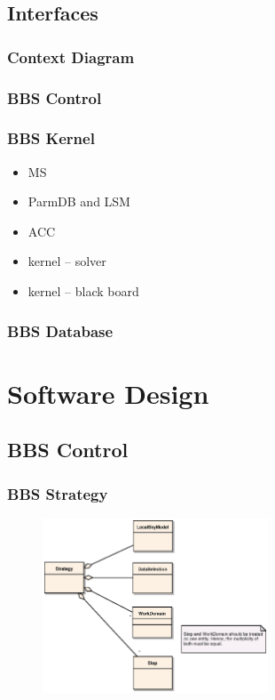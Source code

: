 \documentclass[10pt]{lofar}
\begin{document}
\subsection{Interfaces}
\label{subsec:sys-interfaces}

\subsubsection{Context Diagram}
\label{subsubsec:context}

\subsubsection{BBS Control}
\label{subsubsec:interf-control}

\subsubsection{BBS Kernel}
\label{subsubsec:interf-kernel}

\begin{itemize}
\item MS
\item ParmDB and LSM
\item ACC
\item kernel -- solver
\item kernel -- black board
\end{itemize}

\subsubsection{BBS Database}
\label{subsubsec:interf-database}

\pagebreak

\section{Software Design}
\label{sec:software-design}

\subsection{BBS Control}
\label{subsec:design-control}

\subsubsection{BBS Strategy}
\label{subsubsec:design-strategy}
\begin{figure}[!ht]
\centering
\includegraphics[width=0.6\textwidth]{images/bbs-strategy-class-diagram}
\end{figure}
\end{document}
